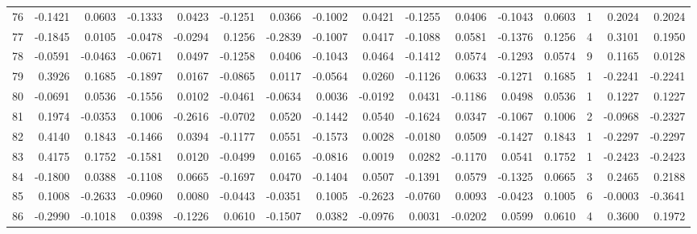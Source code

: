 \begin{tabular}{lrrrrrrrrrrrrrrr}
76  &     -0.1421 &  0.0603 & -0.1333 &  0.0423 & -0.1251 &  0.0366 & -0.1002 &  0.0421 & -0.1255 &  0.0406 &  -0.1043 &     0.0603 &      1 &                    0.2024 &                     0.2024 \\
77  &     -0.1845 &  0.0105 & -0.0478 & -0.0294 &  0.1256 & -0.2839 & -0.1007 &  0.0417 & -0.1088 &  0.0581 &  -0.1376 &     0.1256 &      4 &                    0.3101 &                     0.1950 \\
78  &     -0.0591 & -0.0463 & -0.0671 &  0.0497 & -0.1258 &  0.0406 & -0.1043 &  0.0464 & -0.1412 &  0.0574 &  -0.1293 &     0.0574 &      9 &                    0.1165 &                     0.0128 \\
79  &      0.3926 &  0.1685 & -0.1897 &  0.0167 & -0.0865 &  0.0117 & -0.0564 &  0.0260 & -0.1126 &  0.0633 &  -0.1271 &     0.1685 &      1 &                   -0.2241 &                    -0.2241 \\
80  &     -0.0691 &  0.0536 & -0.1556 &  0.0102 & -0.0461 & -0.0634 &  0.0036 & -0.0192 &  0.0431 & -0.1186 &   0.0498 &     0.0536 &      1 &                    0.1227 &                     0.1227 \\
81  &      0.1974 & -0.0353 &  0.1006 & -0.2616 & -0.0702 &  0.0520 & -0.1442 &  0.0540 & -0.1624 &  0.0347 &  -0.1067 &     0.1006 &      2 &                   -0.0968 &                    -0.2327 \\
82  &      0.4140 &  0.1843 & -0.1466 &  0.0394 & -0.1177 &  0.0551 & -0.1573 &  0.0028 & -0.0180 &  0.0509 &  -0.1427 &     0.1843 &      1 &                   -0.2297 &                    -0.2297 \\
83  &      0.4175 &  0.1752 & -0.1581 &  0.0120 & -0.0499 &  0.0165 & -0.0816 &  0.0019 &  0.0282 & -0.1170 &   0.0541 &     0.1752 &      1 &                   -0.2423 &                    -0.2423 \\
84  &     -0.1800 &  0.0388 & -0.1108 &  0.0665 & -0.1697 &  0.0470 & -0.1404 &  0.0507 & -0.1391 &  0.0579 &  -0.1325 &     0.0665 &      3 &                    0.2465 &                     0.2188 \\
85  &      0.1008 & -0.2633 & -0.0960 &  0.0080 & -0.0443 & -0.0351 &  0.1005 & -0.2623 & -0.0760 &  0.0093 &  -0.0423 &     0.1005 &      6 &                   -0.0003 &                    -0.3641 \\
86  &     -0.2990 & -0.1018 &  0.0398 & -0.1226 &  0.0610 & -0.1507 &  0.0382 & -0.0976 &  0.0031 & -0.0202 &   0.0599 &     0.0610 &      4 &                    0.3600 &                     0.1972 \\

\end{tabular}
